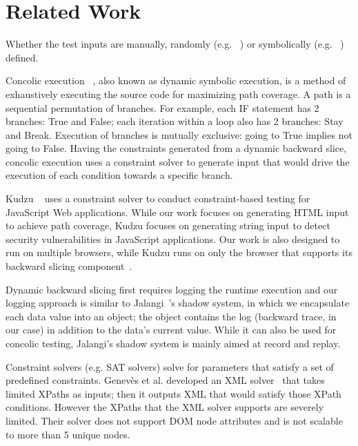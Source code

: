 \section{Related Work}
Whether the test inputs are manually, randomly (e.g. ~\cite{artemis}) or symbolically (e.g. ~\cite{kudzu, jalangi}) defined.



Concolic execution ~\cite{cute}, also known as dynamic symbolic execution, is a method of exhaustively executing the source code for maximizing path coverage. 
A path is a sequential permutation of branches.  For example, each IF statement has 2 branches: True and False; each iteration within a loop also has 2 branches: Stay and Break. 
Execution of branches is mutually exclusive: going to True implies not going to False.
Having the constraints generated from a dynamic backward slice, concolic execution uses a constraint solver to generate input that would drive the execution of each condition towards a specific branch. 

Kudzu ~\cite{kudzu} uses a constraint solver to conduct constraint-based testing for JavaScript Web applications. 
While our work focuses on generating HTML input to achieve path coverage, Kudzu focuses on generating string input to detect security vulnerabilities in JavaScript applications. 
Our work is also designed to run on multiple browsers, while Kudzu runs on only the browser that supports its backward slicing component~\cite{flax}.

Dynamic backward slicing first requires logging the runtime execution and our logging approach is similar to Jalangi~\cite{jalangi}'s shadow system, in which we encapsulate each data value into an object; the object contains the log (backward trace, in our case) in addition to the data's current value. While it can also be used for concolic testing, Jalangi's shadow system is mainly aimed at record and replay.  

Constraint solvers (e.g. SAT solvers) solve for parameters that satisfy a set of predefined constraints.  
Genev\`{e}s et al. developed an XML solver~\cite{xmlsolver} that takes limited XPaths as inputs; then it outputs XML that would satisfy those XPath conditions. 
However the XPaths that the XML solver supports are severely limited. Their solver does not support DOM node attributes and is not scalable to more than 5 unique nodes. 

